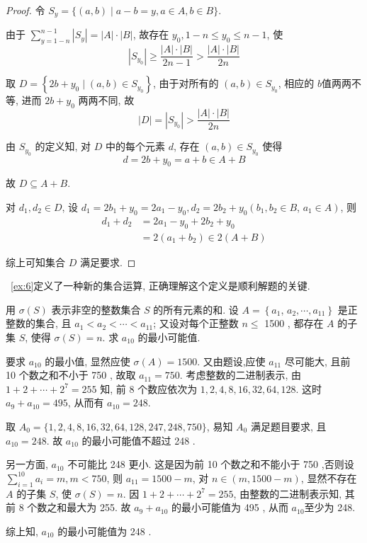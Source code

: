 \begin{proof}
	令 $S_{y}=\{(a, b) \mid a-b=y, a \in A, b \in B\}$.

	由于 $\sum_{y=1-n}^{n-1}\left|S_{y}\right|=|A| \cdot|B|$, 故存在 $y_{0}, 1-n \leqslant y_{0} \leqslant n-1$, 使
	$$
		\left|S_{y_{0}}\right| \geqslant \frac{|A| \cdot|B|}{2 n-1}>\frac{|A| \cdot|B|}{2 n}
	$$

	取 $D=\left\{2 b+y_{0} \mid(a, b) \in S_{y_{0}}\right\}$, 由于对所有的 $(a, b) \in S_{y_{0}}$, 相应的 $b$值两两不等, 进而 $2 b+y_{0}$ 两两不同, 故
	$$
		|D|=\left|S_{y_{0}}\right|>\frac{|A| \cdot|B|}{2 n}
	$$

	由 $S_{y_{0}}$ 的定义知, 对 $D$ 中的每个元素 $d$, 存在 $(a, b) \in S_{y_{0}}$ 使得
	$$
		d=2 b+y_{0}=a+b \in A+B
	$$

	故 $D \subseteq A+B$.

	对 $d_{1}, d_{2} \in D$, 设 $d_{1}=2 b_{1}+y_{0}=2 a_{1}-y_{0}, d_{2}=2 b_{2}+y_{0}\left(b_{1}, b_{2} \in B\right.$, $\left.a_{1} \in A\right)$, 则
	$$
		\begin{aligned}
			d_{1}+d_{2} & =2 a_{1}-y_{0}+2 b_{2}+y_{0}          \\
			            & =2\left(a_{1}+b_{2}\right) \in 2(A+B)
		\end{aligned}
	$$

	综上可知集合 $D$ 满足要求.
\end{proof}

\begin{note}
	~\autoref{ex:6}定义了一种新的集合运算, 正确理解这个定义是顺利解题的关键.
\end{note}

\begin{example}
	用 $\sigma(S)$ 表示非空的整数集合 $S$ 的所有元素的和. 设 $A=\left\{a_{1}\right.$, $\left.a_{2}, \cdots, a_{11}\right\}$ 是正整数的集合, 且 $a_{1}<a_{2}<\cdots<a_{11}$; 又设对每个正整数 $n \leqslant$ 1500 , 都存在 $A$ 的子集 $S$, 使得 $\sigma(S)=n$. 求 $a_{10}$ 的最小可能值.
\end{example}

\begin{analysis}
	要求 $a_{10}$ 的最小值, 显然应使 $\sigma(A)=1500$. 又由题设,应使 $a_{11}$ 尽可能大, 且前 10 个数之和不小于 750 , 故取 $a_{11}=750$. 考虑整数的二进制表示, 由 $1+2+\cdots+2^{7}=255$ 知, 前 8 个数应依次为 $1 ,  2 ,  4 ,  8 ,  16 ,  32 ,  64 ,  128$. 这时 $a_{9}+a_{10}=495$, 从而有 $a_{10}=248$.
\end{analysis}

\begin{solution}
	取 $A_{0}=\{1,2,4,8,16,32,64,128,247,248,750\}$, 易知 $A_{0}$ 满足题目要求, 且 $a_{10}=248$. 故 $a_{10}$ 的最小可能值不超过 248 .

	另一方面, $a_{10}$ 不可能比 248 更小. 这是因为前 10 个数之和不能小于 750 ,否则设 $\sum_{i=1}^{10} a_{i}=m, m<750$, 则 $a_{11}=1500-m$, 对 $n \in(m, 1500-m)$, 显然不存在 $A$ 的子集 $S$, 使 $\sigma(S)=n$. 因 $1+2+\cdots+2^{7}=255$, 由整数的二进制表示知, 其前 8 个数之和最大为 255. 故 $a_{9}+a_{10}$ 的最小可能值为 495 , 从而 $a_{10}$至少为 248.

	综上知, $a_{10}$ 的最小可能值为 248 .
\end{solution}

